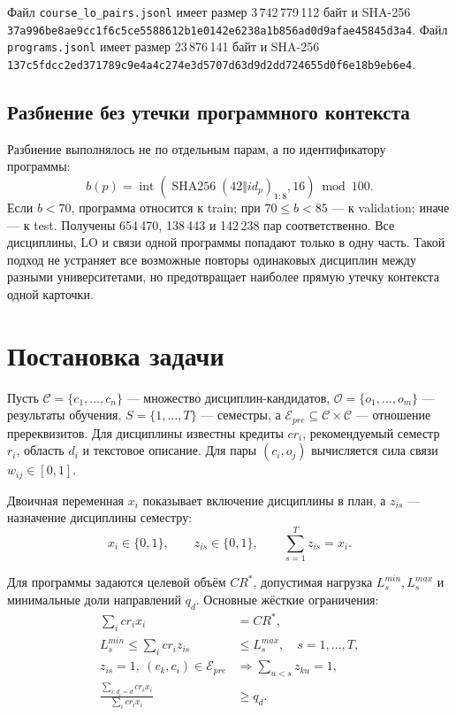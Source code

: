 \documentclass[twoside,11pt]{article}
\newcommand{\Ccal}{\mathcal{C}}
\newcommand{\Ocal}{\mathcal{O}}
\newcommand{\Ecal}{\mathcal{E}}
\begin{document}
Файл \texttt{course\_lo\_pairs.jsonl} имеет размер 3\,742\,779\,112 байт и SHA-256
\texttt{37a996be8ae9cc1f6c5ce5588612b1e0142e6238a1b856ad0d9afae45845d3a4}.
Файл \texttt{programs.jsonl} имеет размер 23\,876\,141 байт и SHA-256
\texttt{137c5fdcc2ed371789c9e4a4c274e3d5707d63d9d2dd724655d0f6e18b9eb6e4}.

\subsection{Разбиение без утечки программного контекста}

Разбиение выполнялось не по отдельным парам, а по идентификатору программы:
\begin{equation}
  b(p)=
  \operatorname{int}\left(
  \operatorname{SHA256}(42\Vert id_p)_{1:8},16
  \right)\bmod 100.
  \label{eq:split}
\end{equation}
Если $b<70$, программа относится к train; при $70\le b<85$ --- к validation; иначе --- к test. Получены 654\,470, 138\,443 и 142\,238 пар соответственно. Все дисциплины, LO и связи одной программы попадают только в одну часть. Такой подход не устраняет все возможные повторы одинаковых дисциплин между разными университетами, но предотвращает наиболее прямую утечку контекста одной карточки.

\section{Постановка задачи}

Пусть $\Ccal=\{c_1,\ldots,c_n\}$ --- множество дисциплин-кандидатов, $\Ocal=\{o_1,\ldots,o_m\}$ --- результаты обучения, $S=\{1,\ldots,T\}$ --- семестры, а $\Ecal_{pre}\subseteq\Ccal\times\Ccal$ --- отношение пререквизитов. Для дисциплины известны кредиты $cr_i$, рекомендуемый семестр $r_i$, область $d_i$ и текстовое описание. Для пары $(c_i,o_j)$ вычисляется сила связи $w_{ij}\in[0,1]$.

Двоичная переменная $x_i$ показывает включение дисциплины в план, а $z_{is}$ --- назначение дисциплины семестру:
\begin{equation}
  x_i\in\{0,1\},\qquad z_{is}\in\{0,1\},\qquad
  \sum_{s=1}^{T} z_{is}=x_i.
  \label{eq:variables}
\end{equation}

Для программы задаются целевой объём $CR^\ast$, допустимая нагрузка $L_s^{min},L_s^{max}$ и минимальные доли направлений $q_d$. Основные жёсткие ограничения:
\begin{align}
  \sum_i cr_i x_i &= CR^\ast, \label{eq:credits}\\
  L_s^{min}\le \sum_i cr_i z_{is} &\le L_s^{max}, \quad s=1,\ldots,T, \label{eq:load}\\
  z_{is}=1,\ (c_k,c_i)\in\Ecal_{pre}
  &\Rightarrow \sum_{u<s}z_{ku}=1, \label{eq:prerequisite}\\
  \frac{\sum_{i:d_i=d}cr_i x_i}{\sum_i cr_i x_i} &\ge q_d. \label{eq:quota}
\end{align}
\end{document}
